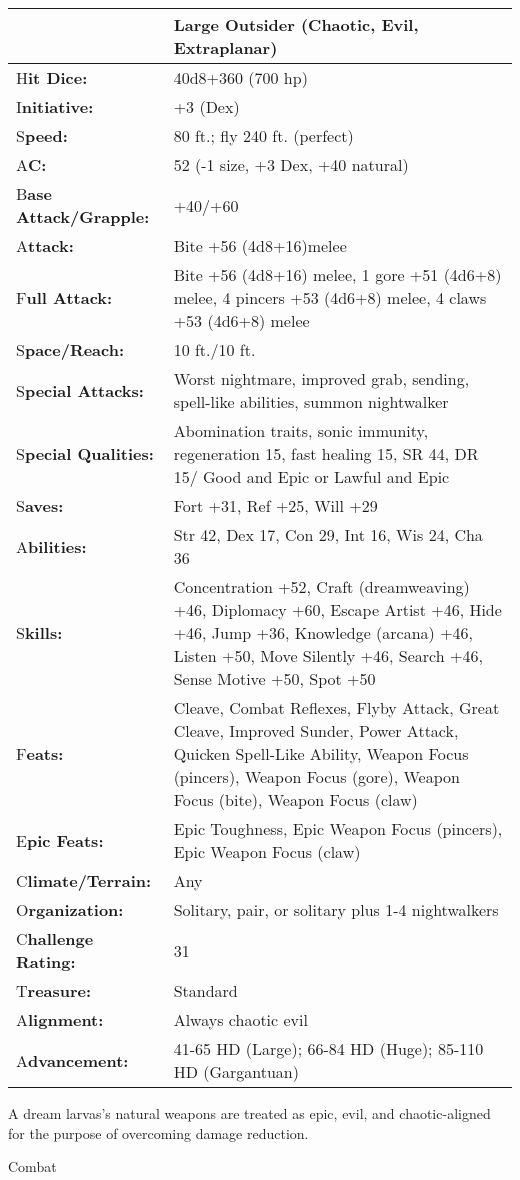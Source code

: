 \documentclass{article}
\begin{document}
\begin{tabular}{|>{\raggedright}p{63pt}|>{\raggedright}p{262pt}|}
\hline
  & Large Outsider (Chaotic, Evil, Extraplanar) \tabularnewline
\hline
H\textbf{it Dice:} &  40d8+360 (700 hp) \tabularnewline
\hline
I\textbf{nitiative:} &  +3 (Dex) \tabularnewline
\hline
S\textbf{peed:} &  80 ft.; fly 240 ft. (perfect) \tabularnewline
\hline
A\textbf{C:} &  52 (-1 size, +3 Dex, +40 natural) \tabularnewline
\hline
B\textbf{ase Attack/Grapple:} &  +40/+60\tabularnewline
\hline
A\textbf{ttack:} &  Bite +56 (4d8+16)melee\tabularnewline
\hline
F\textbf{ull Attack:} &  Bite +56 (4d8+16) melee, 1 gore +51 (4d6+8) melee, 4 pincers 
+53 (4d6+8) melee, 4 claws +53 (4d6+8) melee\tabularnewline
\hline
S\textbf{pace/Reach:} &  10 ft./10 ft. \tabularnewline
\hline
S\textbf{pecial Attacks:} &  Worst nightmare, improved grab, sending, spell-like 
abilities, summon nightwalker\tabularnewline
\hline
S\textbf{pecial Qualities:} &  Abomination traits, sonic immunity, regeneration 
15, fast healing 15, SR 44, DR 15/ Good and Epic or Lawful and Epic \tabularnewline
\hline
S\textbf{aves:} &  Fort +31, Ref +25, Will +29 \tabularnewline
\hline
A\textbf{bilities:} &  Str 42, Dex 17, Con 29, Int 16, Wis 24, Cha 36 \tabularnewline
\hline
S\textbf{kills:} & Concentration +52, Craft (dreamweaving) +46, Diplomacy +60, 
Escape Artist +46, Hide +46, Jump +36, Knowledge (arcana) +46, Listen +50, Move 
Silently +46, Search +46, Sense Motive +50, Spot +50\tabularnewline
\hline
F\textbf{eats:} &  Cleave, Combat Reflexes, Flyby Attack, Great Cleave, Improved 
Sunder, Power Attack, Quicken Spell-Like Ability, Weapon Focus (pincers), Weapon 
Focus (gore), Weapon Focus (bite), Weapon Focus (claw) \tabularnewline
\hline
E\textbf{pic Feats:} &  Epic Toughness, Epic Weapon Focus (pincers), Epic Weapon 
Focus (claw)\tabularnewline
\hline
C\textbf{limate/Terrain:} &  Any \tabularnewline
\hline
O\textbf{rganization:} &  Solitary, pair, or solitary plus 1-4 nightwalkers \tabularnewline
\hline
C\textbf{hallenge Rating:} &  31 \tabularnewline
\hline
T\textbf{reasure:} &  Standard \tabularnewline
\hline
A\textbf{lignment:} &  Always chaotic evil \tabularnewline
\hline
A\textbf{dvancement:} &  41-65 HD (Large); 66-84 HD (Huge); 85-110 HD (Gargantuan) 
\tabularnewline
\hline
\end{tabular}

A dream larvas's natural weapons are treated as epic, evil, and chaotic-aligned 
for the purpose of overcoming damage reduction.

Combat\textbf{ }
\end{document}
